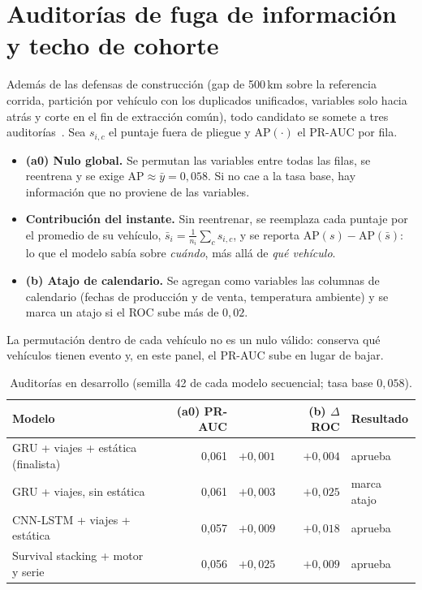 \section{Auditorías de fuga de información y techo de cohorte}
\label{anx:auditorias}

Además de las defensas de construcción (gap de 500\,km sobre la referencia corrida, partición por vehículo con los
duplicados unificados, variables solo hacia atrás y corte en el fin de extracción común), todo candidato se somete a tres
auditorías~\cite{kaufman2012}. Sea $s_{i,c}$ el puntaje fuera de pliegue y $\mathrm{AP}(\cdot)$ el PR-AUC por fila.
\begin{itemize}
  \item \textbf{(a0) Nulo global.} Se permutan las variables entre todas las filas, se reentrena y se exige
    $\mathrm{AP} \approx \bar y = 0{,}058$. Si no cae a la tasa base, hay información que no proviene de las variables.
  \item \textbf{\aprime{} Contribución del instante.} Sin reentrenar, se reemplaza cada puntaje por el promedio de su
    vehículo, $\bar s_i = \frac{1}{n_i}\sum_c s_{i,c}$, y se reporta $\mathrm{AP}(s) - \mathrm{AP}(\bar s)$: lo que el modelo
    sabía sobre \emph{cuándo}, más allá de \emph{qué vehículo}.
  \item \textbf{(b) Atajo de calendario.} Se agregan como variables las columnas de calendario (fechas de producción y de
    venta, temperatura ambiente) y se marca un atajo si el ROC sube más de $0{,}02$.
\end{itemize}
La permutación dentro de cada vehículo no es un nulo válido: conserva qué vehículos tienen evento y, en este panel, el PR-AUC
sube en lugar de bajar.

\begin{table}[!htbp]
\centering
\caption{Auditorías en desarrollo \tagdev{} (semilla 42 de cada modelo secuencial; tasa base $0{,}058$).}
\label{tab:auditorias}
\begin{tabular}{@{}lrrrl@{}}
\toprule
Modelo & (a0) PR-AUC & \aprime{} & (b) $\Delta$ROC & Resultado \\
\midrule
GRU + viajes + estática (finalista) & 0,061 & $+0{,}001$ & $+0{,}004$ & aprueba \\
GRU + viajes, sin estática & 0,061 & $+0{,}003$ & $+0{,}025$ & marca atajo \\
CNN-LSTM + viajes + estática & 0,057 & $+0{,}009$ & $+0{,}018$ & aprueba \\
Survival stacking + motor y serie & 0,056 & $+0{,}025$ & $+0{,}009$ & aprueba \\
\bottomrule
\end{tabular}
\end{table}

